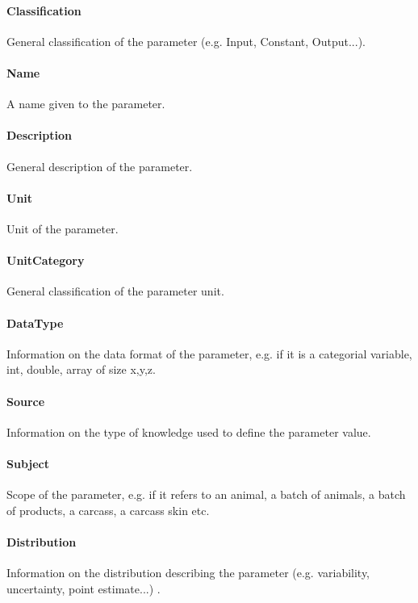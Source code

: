 \documentclass[a4paper]{report}
\begin{document}
\paragraph{Classification}
General classification of the parameter (e.g. Input, Constant, Output...).

\paragraph{Name}
A name given to the parameter.

\paragraph{Description}
General description of the parameter.

\paragraph{Unit}
Unit of the parameter.

\paragraph{UnitCategory}
General classification of the parameter unit.

\paragraph{DataType}
Information on the data format of the parameter, e.g. if it is a categorial variable, int, double, array of size x,y,z.

\paragraph{Source}
Information on the type of knowledge used to define the parameter value.

\paragraph{Subject}
Scope of the parameter, e.g. if it refers to an animal, a batch of animals, a batch of products, a carcass, a carcass skin etc.

\paragraph{Distribution}
Information on the distribution describing the parameter (e.g. variability, uncertainty, point estimate...) .
\end{document}
